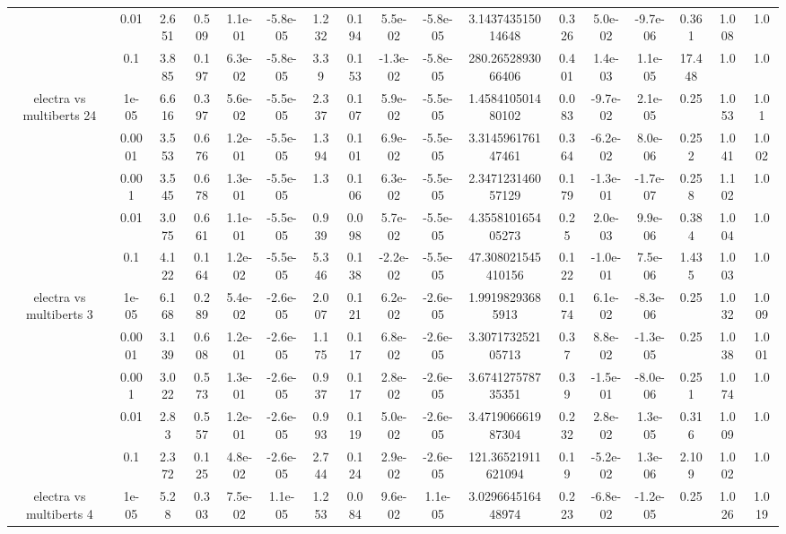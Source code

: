 \begin{tabular}{|c|c|c|c|c|c|c|c|c|c|c|c|c|c|c|c|c|}
 & 0.01 & 2.651 & 0.509 & 1.1e-01 & -5.8e-05 & 1.232 & 0.194 & 5.5e-02 & -5.8e-05 & 3.143743515014648 & 0.326 & 5.0e-02 & -9.7e-06 & 0.361 & 1.008 & 1.0 \\
 & 0.1 & 3.885 & 0.197 & 6.3e-02 & -5.8e-05 & 3.39 & 0.153 & -1.3e-02 & -5.8e-05 & 280.2652893066406 & 0.401 & 1.4e-03 & 1.1e-05 & 17.448 & 1.0 & 1.0 \\
\hline
\multirow{5}{*}{electra  vs multiberts 24} & 1e-05 & 6.616 & 0.397 & 5.6e-02 & -5.5e-05 & 2.337 & 0.107 & 5.9e-02 & -5.5e-05 & 1.458410501480102 & 0.083 & -9.7e-02 & 2.1e-05 & 0.25 & 1.053 & 1.01 \\
 & 0.0001 & 3.553 & 0.676 & 1.2e-01 & -5.5e-05 & 1.394 & 0.101 & 6.9e-02 & -5.5e-05 & 3.314596176147461 & 0.364 & -6.2e-02 & 8.0e-06 & 0.252 & 1.041 & 1.002 \\
 & 0.001 & 3.545 & 0.678 & 1.3e-01 & -5.5e-05 & 1.3 & 0.106 & 6.3e-02 & -5.5e-05 & 2.347123146057129 & 0.179 & -1.3e-01 & -1.7e-07 & 0.258 & 1.102 & 1.0 \\
 & 0.01 & 3.075 & 0.661 & 1.1e-01 & -5.5e-05 & 0.939 & 0.098 & 5.7e-02 & -5.5e-05 & 4.355810165405273 & 0.25 & 2.0e-03 & 9.9e-06 & 0.384 & 1.004 & 1.0 \\
 & 0.1 & 4.122 & 0.164 & 1.2e-02 & -5.5e-05 & 5.346 & 0.138 & -2.2e-02 & -5.5e-05 & 47.308021545410156 & 0.122 & -1.0e-01 & 7.5e-06 & 1.435 & 1.003 & 1.0 \\
\hline
\multirow{5}{*}{electra  vs multiberts 3} & 1e-05 & 6.168 & 0.289 & 5.4e-02 & -2.6e-05 & 2.007 & 0.121 & 6.2e-02 & -2.6e-05 & 1.99198293685913 & 0.174 & 6.1e-02 & -8.3e-06 & 0.25 & 1.032 & 1.009 \\
 & 0.0001 & 3.139 & 0.608 & 1.2e-01 & -2.6e-05 & 1.175 & 0.117 & 6.8e-02 & -2.6e-05 & 3.307173252105713 & 0.37 & 8.8e-02 & -1.3e-05 & 0.25 & 1.038 & 1.001 \\
 & 0.001 & 3.022 & 0.573 & 1.3e-01 & -2.6e-05 & 0.937 & 0.117 & 2.8e-02 & -2.6e-05 & 3.674127578735351 & 0.39 & -1.5e-01 & -8.0e-06 & 0.251 & 1.074 & 1.0 \\
 & 0.01 & 2.83 & 0.557 & 1.2e-01 & -2.6e-05 & 0.993 & 0.119 & 5.0e-02 & -2.6e-05 & 3.471906661987304 & 0.232 & 2.8e-02 & 1.3e-05 & 0.316 & 1.009 & 1.0 \\
 & 0.1 & 2.372 & 0.125 & 4.8e-02 & -2.6e-05 & 2.744 & 0.124 & 2.9e-02 & -2.6e-05 & 121.36521911621094 & 0.19 & -5.2e-02 & 1.3e-06 & 2.109 & 1.002 & 1.0 \\
\hline
\multirow{5}{*}{electra  vs multiberts 4} & 1e-05 & 5.28 & 0.303 & 7.5e-02 & 1.1e-05 & 1.253 & 0.084 & 9.6e-02 & 1.1e-05 & 3.029664516448974 & 0.223 & -6.8e-02 & -1.2e-05 & 0.25 & 1.026 & 1.019 \\

\end{tabular}
